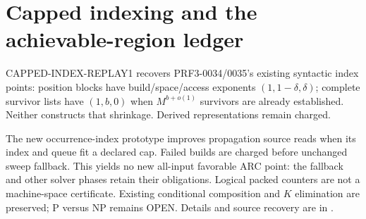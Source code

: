 \section{Capped indexing and the achievable-region ledger}
CAPPED-INDEX-REPLAY1 recovers PRF3-0034/0035's existing syntactic index
points: position blocks have build/space/access exponents
$(1,1-\delta,\delta)$; complete survivor lists have $(1,b,0)$ when
$M^{b+o(1)}$ survivors are already established. Neither constructs that
shrinkage. Derived representations remain charged.

The new occurrence-index prototype improves propagation source reads
when its index and queue fit a declared cap. Failed builds are charged
before unchanged sweep fallback. This yields no new all-input favorable
ARC point: the fallback and other solver phases retain their obligations.
Logical packed counters are not a machine-space certificate. Existing
conditional composition and $K$ elimination are preserved; P versus NP
remains OPEN. Details and source recovery are in
.
